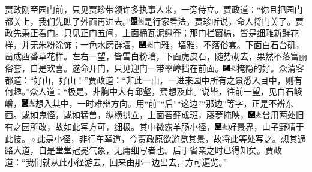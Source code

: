 贾政刚至园门前，只见贾珍带领许多执事人来，一旁侍立。贾政道：“你且把园门都关上，我们先瞧了外面再进去。”{\includegraphics[width=3mm]{../Images/00004}\includegraphics[width=3mm]{../Images/00011}\footnotesize \kaishu 是行家看法。}贾珍听说，命人将门关了。贾政先秉正看门。只见正门五间，上面桶瓦泥鳅脊；那门栏窗槅，皆是细雕新鲜花样，并无朱粉涂饰；一色水磨群墙，{\includegraphics[width=3mm]{../Images/00003}\includegraphics[width=3mm]{../Images/00012}\footnotesize \kaishu 门雅，墙雅，不落俗套。}下面白石台矶，凿成西番草花样。左右一望，皆雪白粉墙，下面虎皮石，随势砌去，果然不落富丽俗套，自是欢喜。遂命开门，只见迎门一带翠嶂挡在前面。{\includegraphics[width=3mm]{../Images/00003}\includegraphics[width=3mm]{../Images/00012}\footnotesize \kaishu 掩隐的好。}众清客都道：“好山，好山！”贾政道：“非此一山，一进来园中所有之景悉入目中，则有何趣。”众人道：“极是。非胸中大有邱壑，焉想及此。”说毕，往前一望，见白石崚嶒，{\includegraphics[width=3mm]{../Images/00003}\includegraphics[width=3mm]{../Images/00012}\footnotesize \kaishu 想入其中，一时难辩方向。用“前”“后”“这边”“那边”等字，正是不辨东西。}或如鬼怪，或如猛兽，纵横拱立，上面苔藓成斑，藤萝掩映，{\includegraphics[width=3mm]{../Images/00003}\includegraphics[width=3mm]{../Images/00012}\footnotesize \kaishu 曾用两处旧有之园所改，故如此写方可，细极。}其中微露羊肠小径，{\includegraphics[width=3mm]{../Images/00003}\includegraphics[width=3mm]{../Images/00012}\footnotesize \kaishu 好景界，山子野精于此技。{$\diamond$}此是小径，非行车辇道，今贾政原欲游览其景，故将此等处写之。想其通路大道，自是堂堂冠冕气象，无庸细写者也。后于省亲之时已得知矣。}贾政道：“我们就从此小径游去，回来由那一边出去，方可遍览。”

